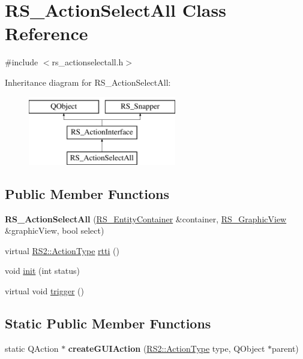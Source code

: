\hypertarget{classRS__ActionSelectAll}{\section{R\-S\-\_\-\-Action\-Select\-All Class Reference}
\label{classRS__ActionSelectAll}
}


{\ttfamily \#include $<$rs\-\_\-actionselectall.\-h$>$}

Inheritance diagram for R\-S\-\_\-\-Action\-Select\-All\-:\begin{figure}[H]
\begin{center}
\leavevmode
\includegraphics[height=3.000000cm]{classRS__ActionSelectAll}
\end{center}
\end{figure}
\subsection*{Public Member Functions}
\begin{DoxyCompactItemize}
\item 
\hypertarget{classRS__ActionSelectAll_aa4f9baece66dc102d0f90b5b26d61a16}{{\bfseries R\-S\-\_\-\-Action\-Select\-All} (\hyperlink{classRS__EntityContainer}{R\-S\-\_\-\-Entity\-Container} \&container, \hyperlink{classRS__GraphicView}{R\-S\-\_\-\-Graphic\-View} \&graphic\-View, bool select)}\label{classRS__ActionSelectAll_aa4f9baece66dc102d0f90b5b26d61a16}

\item 
virtual \hyperlink{classRS2_afe3523e0bc41fd637b892321cfc4b9d7}{R\-S2\-::\-Action\-Type} \hyperlink{classRS__ActionSelectAll_a6f00f94529c8e1f5ff0f729d1b033d8b}{rtti} ()
\item 
void \hyperlink{classRS__ActionSelectAll_a8915d60bf614b2c7e7ac395993321bd1}{init} (int status)
\item 
virtual void \hyperlink{classRS__ActionSelectAll_af3cd65c374ea0e7d1ab223ea07d091bb}{trigger} ()
\end{DoxyCompactItemize}
\subsection*{Static Public Member Functions}
\begin{DoxyCompactItemize}
\item 
\hypertarget{classRS__ActionSelectAll_afc1b3b18e5c7e712ece04c67901ffa6a}{static Q\-Action $\ast$ {\bfseries create\-G\-U\-I\-Action} (\hyperlink{classRS2_afe3523e0bc41fd637b892321cfc4b9d7}{R\-S2\-::\-Action\-Type} type, Q\-Object $\ast$parent)}\label{classRS__ActionSelectAll_afc1b3b18e5c7e712ece04c67901ffa6a}

\end{DoxyCompactItemize}
